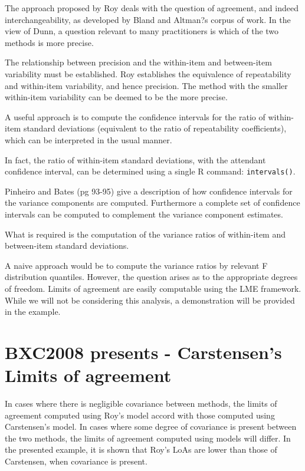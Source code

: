 \documentclass[12pt, a4paper]{report}
\theoremstyle{plain}
\theoremstyle{definition}
\theoremstyle{remark}
\begin{document}
The approach proposed by Roy deals with the question of agreement, and indeed interchangeability, as developed by Bland and Altman?s corpus of work.  In the view of Dunn, a question relevant to many practitioners is which of the two methods is more precise.

The relationship between precision and the within-item and between-item variability must be established. Roy establishes the equivalence of repeatability and within-item variability, and hence precision.  The method with the smaller within-item variability can be deemed to be the more precise.

A useful approach is to compute the confidence intervals for the ratio of within-item standard deviations (equivalent to the ratio of repeatability coefficients), which can be interpreted in the usual manner.  

In fact, the ratio of within-item standard deviations, with the attendant confidence interval,  can be determined using a single R command: \texttt{intervals()}.

Pinheiro and Bates (pg 93-95) give a description of how confidence intervals for the variance components are computed. Furthermore a complete set of confidence intervals can be computed to complement the variance component estimates. 

What is required is the computation of the variance ratios of within-item and between-item standard deviations.  

A naive  approach would be to compute the variance ratios by relevant F distribution quantiles. However, the question arises as to the appropriate degrees of freedom.
Limits of agreement are easily computable using the LME framework. While we will not be considering this analysis, a demonstration will be provided in the example.

\section{BXC2008 presents - Carstensen's Limits of agreement}


In cases where there is negligible covariance between methods, the limits of agreement computed using Roy's model accord with those computed using Carstensen's model. In cases where some degree of covariance is present between the two methods, the limits of agreement computed using models will differ. In the presented example, it is shown that Roy's LoAs are lower than those of Carstensen, when covariance is present.
\end{document}

